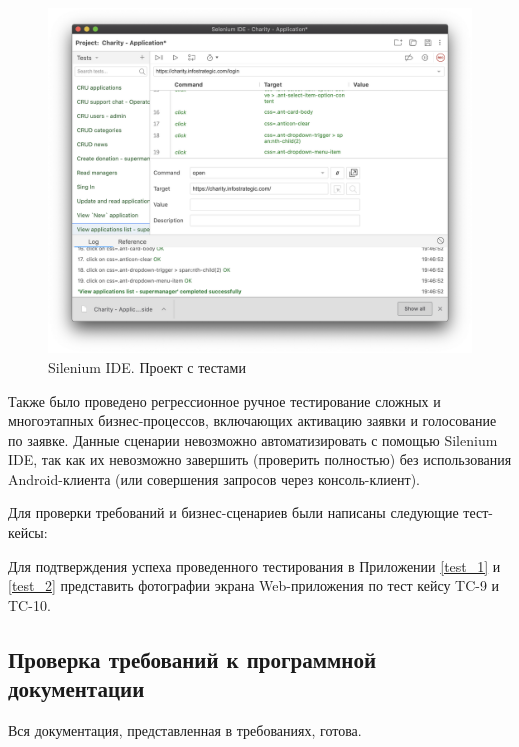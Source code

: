 \documentclass[a4paper,12pt,reqno]{article}
\begin{document}
	\begin{figure}[H]
		\centering
		\includegraphics[width = \linewidth]{img/silenium.png}
		\caption{Silenium IDE. Проект с тестами}
		\label{pic: silenium}
	\end{figure}
	
	Также было проведено регрессионное ручное тестирование сложных и многоэтапных бизнес-процессов, включающих активацию заявки и голосование по заявке. Данные сценарии невозможно автоматизировать с помощью Silenium IDE, так как их невозможно завершить (проверить полностью) без использования Android-клиента (или совершения запросов через консоль-клиент). 
	
	Для проверки требований и бизнес-сценариев были написаны следующие тест-кейсы:
	
	
	
	Для подтверждения успеха проведенного тестирования в Приложении \ref{test_1} и \ref{test_2} представить фотографии экрана Web-приложения по тест кейсу TC-9 и TC-10.
	
	\subsection{Проверка требований к программной документации}
	Вся документация, представленная в требованиях, готова.
	
\end{document}

